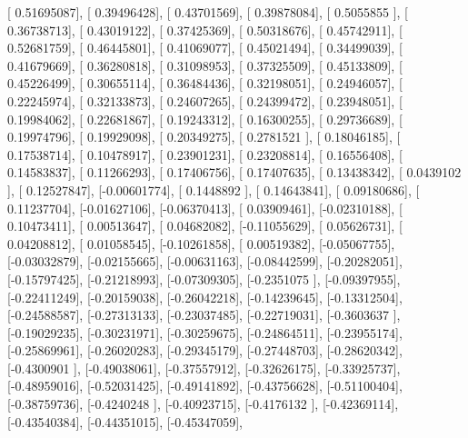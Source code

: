\documentclass{article}
\begin{document}
       [ 0.51695087],
       [ 0.39496428],
       [ 0.43701569],
       [ 0.39878084],
       [ 0.5055855 ],
       [ 0.36738713],
       [ 0.43019122],
       [ 0.37425369],
       [ 0.50318676],
       [ 0.45742911],
       [ 0.52681759],
       [ 0.46445801],
       [ 0.41069077],
       [ 0.45021494],
       [ 0.34499039],
       [ 0.41679669],
       [ 0.36280818],
       [ 0.31098953],
       [ 0.37325509],
       [ 0.45133809],
       [ 0.45226499],
       [ 0.30655114],
       [ 0.36484436],
       [ 0.32198051],
       [ 0.24946057],
       [ 0.22245974],
       [ 0.32133873],
       [ 0.24607265],
       [ 0.24399472],
       [ 0.23948051],
       [ 0.19984062],
       [ 0.22681867],
       [ 0.19243312],
       [ 0.16300255],
       [ 0.29736689],
       [ 0.19974796],
       [ 0.19929098],
       [ 0.20349275],
       [ 0.2781521 ],
       [ 0.18046185],
       [ 0.17538714],
       [ 0.10478917],
       [ 0.23901231],
       [ 0.23208814],
       [ 0.16556408],
       [ 0.14583837],
       [ 0.11266293],
       [ 0.17406756],
       [ 0.17407635],
       [ 0.13438342],
       [ 0.0439102 ],
       [ 0.12527847],
       [-0.00601774],
       [ 0.1448892 ],
       [ 0.14643841],
       [ 0.09180686],
       [ 0.11237704],
       [-0.01627106],
       [-0.06370413],
       [ 0.03909461],
       [-0.02310188],
       [ 0.10473411],
       [ 0.00513647],
       [ 0.04682082],
       [-0.11055629],
       [ 0.05626731],
       [ 0.04208812],
       [ 0.01058545],
       [-0.10261858],
       [ 0.00519382],
       [-0.05067755],
       [-0.03032879],
       [-0.02155665],
       [-0.00631163],
       [-0.08442599],
       [-0.20282051],
       [-0.15797425],
       [-0.21218993],
       [-0.07309305],
       [-0.2351075 ],
       [-0.09397955],
       [-0.22411249],
       [-0.20159038],
       [-0.26042218],
       [-0.14239645],
       [-0.13312504],
       [-0.24588587],
       [-0.27313133],
       [-0.23037485],
       [-0.22719031],
       [-0.3603637 ],
       [-0.19029235],
       [-0.30231971],
       [-0.30259675],
       [-0.24864511],
       [-0.23955174],
       [-0.25869961],
       [-0.26020283],
       [-0.29345179],
       [-0.27448703],
       [-0.28620342],
       [-0.4300901 ],
       [-0.49038061],
       [-0.37557912],
       [-0.32626175],
       [-0.33925737],
       [-0.48959016],
       [-0.52031425],
       [-0.49141892],
       [-0.43756628],
       [-0.51100404],
       [-0.38759736],
       [-0.4240248 ],
       [-0.40923715],
       [-0.4176132 ],
       [-0.42369114],
       [-0.43540384],
       [-0.44351015],
       [-0.45347059],
\end{document}
